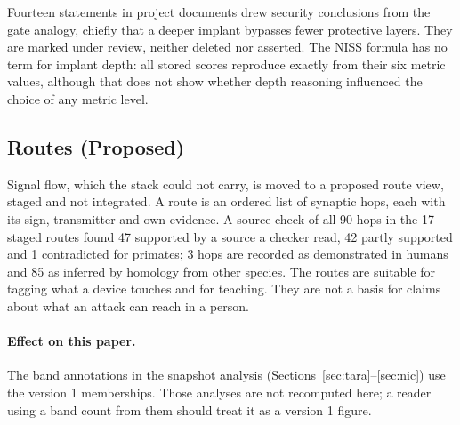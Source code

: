 Fourteen statements in project documents drew security conclusions from the gate analogy,
chiefly that a deeper implant bypasses fewer protective layers. They are marked under
review, neither deleted nor asserted. The NISS formula has no term for implant depth: all
\LiveNissScored{} stored scores reproduce exactly from their six metric values, although
that does not show whether depth reasoning influenced the choice of any metric level.

\subsection{Routes (Proposed)}

Signal flow, which the stack could not carry, is moved to a proposed route view, staged and
not integrated. A route is an ordered list of synaptic hops, each with its sign,
transmitter and own evidence. A source check of all 90 hops in the 17 staged routes found
47 supported by a source a checker read, 42 partly supported and 1 contradicted for
primates; 3 hops are recorded as demonstrated in humans and 85 as inferred by homology from
other species. The routes are suitable for tagging what a device touches and for teaching.
They are not a basis for claims about what an attack can reach in a person.

\paragraph{Effect on this paper.}
The band annotations in the snapshot analysis (Sections~\ref{sec:tara}--\ref{sec:nic}) use
the version 1 memberships. Those analyses are not recomputed here; a reader using a band
count from them should treat it as a version 1 figure.
